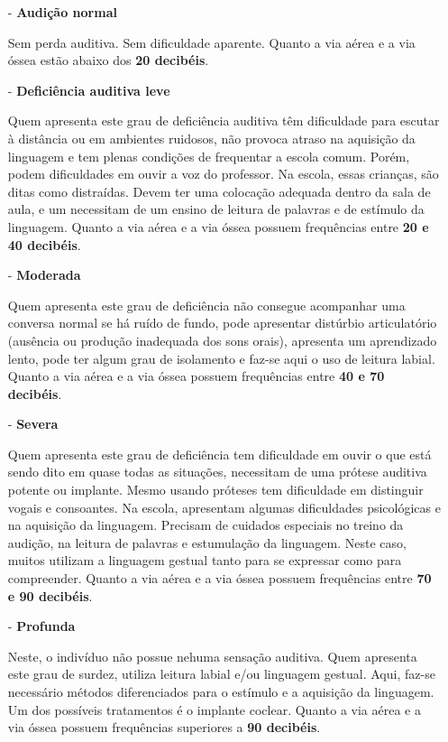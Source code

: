 \documentclass[brasil]{abnt}
\begin{document}
				\begin{itemize}		
					\item [-] \textbf{Audição normal}
					
					Sem perda auditiva. Sem dificuldade aparente. Quanto a via aérea e a via óssea estão abaixo dos \textbf{20 decibéis}. 
					
					\item [-] \textbf{Deficiência auditiva leve} 
					
					Quem apresenta este grau de deficiência auditiva têm dificuldade para escutar à distância ou em ambientes ruidosos, 
					não provoca atraso na aquisição da linguagem e tem plenas condições de frequentar a escola comum. Porém, podem dificuldades 
					em ouvir a voz do professor. Na escola, essas crianças, são ditas como distraídas.
					Devem ter uma colocação adequada dentro da sala de aula, e um necessitam de um ensino de leitura de palavras e de estímulo 
					da linguagem. Quanto a via aérea e a via óssea possuem frequências entre \textbf{20 e 40 decibéis}.
										
					\item [-] \textbf{Moderada} 
					
					Quem apresenta este grau de deficiência não consegue acompanhar uma conversa normal se há ruído de fundo, pode apresentar 
					distúrbio articulatório (ausência ou produção inadequada dos sons orais), apresenta um aprendizado lento, pode ter algum grau de 
					isolamento e faz-se aqui o uso de leitura labial. Quanto a via aérea e a via óssea possuem frequências entre \textbf{40 e 70 decibéis}.
					
					\item [-] \textbf{Severa}
					
					Quem apresenta este grau de deficiência tem dificuldade em ouvir o que está sendo dito em quase todas as situações, necessitam 
					de uma prótese auditiva potente ou implante. Mesmo usando próteses tem dificuldade em distinguir vogais e consoantes. Na escola, apresentam
					algumas dificuldades psicológicas e na aquisição da linguagem. Precisam de cuidados especiais no treino da audição, na leitura de palavras e 
					estumulação da linguagem. Neste caso, muitos utilizam a linguagem gestual tanto para se expressar como para compreender. Quanto a via aérea 
					e a via óssea possuem frequências entre \textbf{70 e 90 decibéis}.
					
					\item [-] \textbf{Profunda}
					
					Neste, o indivíduo não possue nehuma sensação auditiva. Quem apresenta este grau de surdez, utiliza leitura labial e/ou linguagem gestual.
					Aqui, faz-se necessário métodos diferenciados para o estímulo e a aquisição da linguagem. Um dos possíveis tratamentos é o implante coclear.
					Quanto a via aérea e a via óssea possuem frequências superiores a \textbf{90 decibéis}.
					
				\end{itemize}
\end{document}
